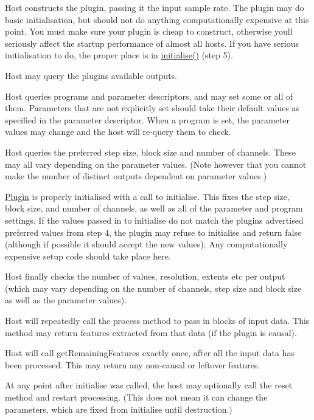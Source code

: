 \begin{DoxyEnumerate}
\item Host constructs the plugin, passing it the input sample rate. The plugin may do basic initialisation, but should not do anything computationally expensive at this point. You must make sure your plugin is cheap to construct, otherwise you\textquotesingle{}ll seriously affect the startup performance of almost all hosts. If you have serious initialisation to do, the proper place is in \hyperlink{class_vamp_1_1_plugin_af26212cf5fc511b603a8b48034247822}{initialise()} (step 5).
\item Host may query the plugin\textquotesingle{}s available outputs.
\item Host queries programs and parameter descriptors, and may set some or all of them. Parameters that are not explicitly set should take their default values as specified in the parameter descriptor. When a program is set, the parameter values may change and the host will re-\/query them to check.
\item Host queries the preferred step size, block size and number of channels. These may all vary depending on the parameter values. (Note however that you cannot make the number of distinct outputs dependent on parameter values.)
\item \hyperlink{class_vamp_1_1_plugin}{Plugin} is properly initialised with a call to initialise. This fixes the step size, block size, and number of channels, as well as all of the parameter and program settings. If the values passed in to initialise do not match the plugin\textquotesingle{}s advertised preferred values from step 4, the plugin may refuse to initialise and return false (although if possible it should accept the new values). Any computationally expensive setup code should take place here.
\item Host finally checks the number of values, resolution, extents etc per output (which may vary depending on the number of channels, step size and block size as well as the parameter values).
\item Host will repeatedly call the process method to pass in blocks of input data. This method may return features extracted from that data (if the plugin is causal).
\item Host will call get\+Remaining\+Features exactly once, after all the input data has been processed. This may return any non-\/causal or leftover features.
\item At any point after initialise was called, the host may optionally call the reset method and restart processing. (This does not mean it can change the parameters, which are fixed from initialise until destruction.)
\end{DoxyEnumerate}

